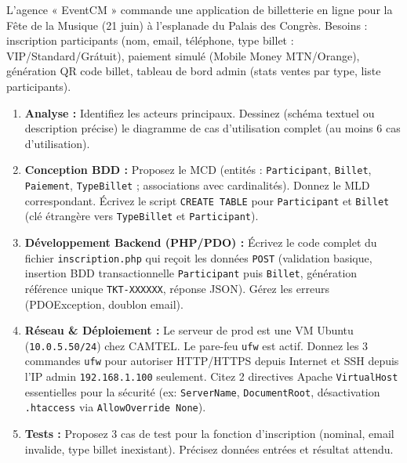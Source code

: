 \documentclass[11pt]{article}
\begin{document}
\begin{exercice}
L'agence « EventCM » commande une application de billetterie en ligne pour la Fête de la Musique (21 juin) à l'esplanade du Palais des Congrès. Besoins : inscription participants (nom, email, téléphone, type billet : VIP/Standard/Grátuit), paiement simulé (Mobile Money MTN/Orange), génération QR code billet, tableau de bord admin (stats ventes par type, liste participants).
\begin{enumerate}
    \item \textbf{Analyse :} Identifiez les acteurs principaux. Dessinez (schéma textuel ou description précise) le diagramme de cas d'utilisation complet (au moins 6 cas d'utilisation).
    \item \textbf{Conception BDD :} Proposez le MCD (entités : \texttt{Participant}, \texttt{Billet}, \texttt{Paiement}, \texttt{TypeBillet} ; associations avec cardinalités). Donnez le MLD correspondant. Écrivez le script \texttt{CREATE TABLE} pour \texttt{Participant} et \texttt{Billet} (clé étrangère vers \texttt{TypeBillet} et \texttt{Participant}).
    \item \textbf{Développement Backend (PHP/PDO) :} Écrivez le code complet du fichier \texttt{inscription.php} qui reçoit les données \texttt{POST} (validation basique, insertion BDD transactionnelle \texttt{Participant} puis \texttt{Billet}, génération référence unique \texttt{TKT-XXXXXX}, réponse JSON). Gérez les erreurs (PDOException, doublon email).
    \item \textbf{Réseau \& Déploiement :} Le serveur de prod est une VM Ubuntu (\texttt{10.0.5.50/24}) chez CAMTEL. Le pare-feu \texttt{ufw} est actif. Donnez les 3 commandes \texttt{ufw} pour autoriser HTTP/HTTPS depuis Internet et SSH depuis l'IP admin \texttt{192.168.1.100} seulement. Citez 2 directives Apache \texttt{VirtualHost} essentielles pour la sécurité (ex: \texttt{ServerName}, \texttt{DocumentRoot}, désactivation \texttt{.htaccess} via \texttt{AllowOverride None}).
    \item \textbf{Tests :} Proposez 3 cas de test pour la fonction d'inscription (nominal, email invalide, type billet inexistant). Précisez données entrées et résultat attendu.
\end{enumerate}
\end{exercice}
\end{document}
